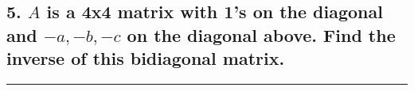 \documentclass[
  letterpaper,
  DIV=11,
  numbers=noendperiod]{scrartcl}
\begin{document}
\newpage{}

\hypertarget{a-is-a-4x4-matrix-with-1s-on-the-diagonal-and--a--b--c-on-the-diagonal-above.-find-the-inverse-of-this-bidiagonal-matrix.}{%
\subsection{\texorpdfstring{5. \(A\) is a 4x4 matrix with 1's on the
diagonal and \(-a, -b, -c\) on the diagonal above. Find the inverse of
this bidiagonal
matrix.}{5. A is a 4x4 matrix with 1's on the diagonal and -a, -b, -c on the diagonal above. Find the inverse of this bidiagonal matrix.}}\label{a-is-a-4x4-matrix-with-1s-on-the-diagonal-and--a--b--c-on-the-diagonal-above.-find-the-inverse-of-this-bidiagonal-matrix.}}

\centering \textcolor[RGB]{0,0,0}{\rule{\linewidth}{0.6pt}}
\end{document}
